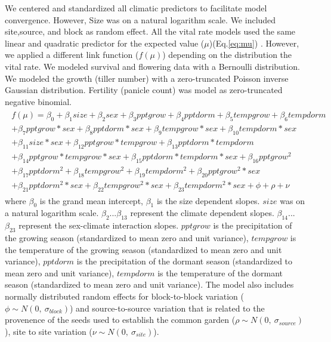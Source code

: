 \documentclass[12pt]{article}
\begin{document}
We centered and standardized all climatic predictors to facilitate model convergence.
However, Size was on a natural logarithm scale. 
We included site,source, and block as random effect.
All the vital rate models used the same linear and quadratic predictor for the expected value ($\mu$)(Eq.\ref{eq:mu}) . 
However, we applied a different link function ($f(\mu)$) depending on the distribution the vital rate. 
We modeled survival and flowering data with a Bernoulli distribution.
We modeled the growth (tiller number) with a zero-truncated Poisson inverse Gaussian distribution. 
Fertility (panicle count) was model as zero-truncated negative binomial. 
\begin{align}\label{eq:mu}
\begin{split}
f(\mu) = \beta_{0} + \beta_{1}size + \beta_{2}sex + \beta_{3}pptgrow + \beta_{4}pptdorm + \beta_{5}tempgrow + \beta_{6}tempdorm \\ 
+ \beta_{7}pptgrow*sex + \beta_{8}pptdorm*sex + \beta_{9}tempgrow*sex + \beta_{10}tempdorm*sex  \\ 
+  \beta_{11}size*sex + \beta_{12}pptgrow*tempgrow + \beta_{13}pptdorm*tempdorm\\
+ \beta_{14}pptgrow*tempgrow*sex + \beta_{15}pptdorm*tempdorm*sex + \beta_{16}pptgrow^2\\
+ \beta_{17}pptdorm^2 + \beta_{18}tempgrow^2 + \beta_{19}tempdorm^2 + \beta_{20}pptgrow^2*sex  \\
+ \beta_{21}pptdorm^2*sex + \beta_{22}tempgrow^2*sex + \beta_{23}tempdorm^2*sex + \phi + \rho + \nu 
\end{split}
\end{align}
\noindent where $\beta_{0}$ is the  grand mean intercept, $\beta_{1}$ is the size dependent slopes.
$size$ was on a natural logarithm scale. 
$\beta_{2}$...$\beta_{13}$ represent the climate dependent slopes.
$\beta_{14}$...$\beta_{23}$ represent the sex-climate interaction slopes.
$pptgrow$ is the precipitation of the growing season (standardized to mean zero and unit variance), $tempgrow$ is the temperature of the growing season (standardized to mean zero and unit variance), $pptdorm$ is the precipitation of the dormant season (standardized to mean zero and unit variance), $tempdorm$ is the temperature of the dormant season (standardized to mean zero and unit variance).
The model also includes normally distributed random effects for block-to-block variation ($\phi \sim N(0,\ \sigma_{block})$) and source-to-source variation that is related to the provenence of the seeds used to establish the common garden ($\rho \sim N(0,\ \sigma_{source})$), site to site variation ($\nu \sim N(0,\ \sigma_{site})$).
\end{document}
